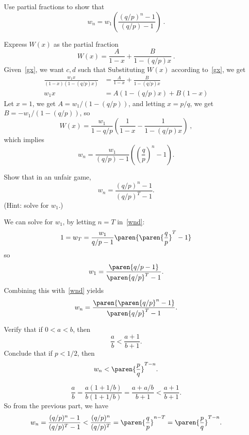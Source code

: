 \begin{problem}
\begin{solution}
\end{solution}

\ppart Use partial fractions to show that 
\begin{equation}\label{wnd}
w_n = w_1 \left( \frac{(q/p)^n - 1}{(q/p)-1}\right) \ .
\end{equation}

\begin{solution}

  Express $W(x)$ as the partial fraction 
  \[ W(x) = \frac{A}{1-x} + \frac{B}{1-(q/p)x} \ . \]
  Given~\eqref{gx}, we want $c,d$ such that
  Substituting $W(x)$ according to~\eqref{gx}, we get
\begin{align*}
    \frac{w_1 x}{(1-x)(1-(q/p)x)} &= \frac{A}{1-x} + \frac{B}{1-(q/p)x}
    \\
    w_1 x &= A(1-(q/p)x) + B(1-x)
\end{align*}
  Let $x=1$, we get $A = w_1/(1-(q/p))$, and letting $x=p/q$, we get
  $B = -w_1/(1-(q/p))$, so
  \[
W(x) = \frac{w_1}{1-q/p}\left(\frac{1}{1-x} -
    \frac{1}{1-(q/p)x}\right) \ ,
\]
  which implies
 \[
w_n = \frac{w_1}{(q/p)-1}\left(\left(\frac{q}{p}\right)^n -
    1\right) .
\]

\end{solution}

\ppart  Show that in an unfair game,
\[
w_n=\frac{(q/p)^n-1}{(q/p)^T-1}.
\]
(Hint: solve for $w_1$.)

\begin{solution}

We can solve for $w_1$, by letting $n=T$ in~\eqref{wnd}:
\[
1=w_T = \frac{w_1}{q/p-1} \paren{\paren{\frac{q}{p}}^T -1}
\]
so
\[
w_1 = \frac{\paren{q/p -1}}{\paren{q/p}^T - 1}.
\]
Combining this with~\eqref{wnd} yields
\[
w_n = \frac{\paren{\paren{q/p}^n -1}}{\paren{q/p}^T -1}.
\]

\end{solution}

\ppart Verify that if $0 < a < b$, then
\[
\frac{a}{b} < \frac{a+1}{b+1}.
\]
Conclude that if $p < 1/2$, then
\[
w_n < \paren{\frac{p}{q}}^{T-n}.
\]

\begin{solution}
\[
\frac{a}{b} = \frac{a(1+1/b)}{b(1+1/b)} = \frac{a+a/b}{b+1} < \frac{a+1}{b+1}.
\]
So from the previous part, we have
\[
w_n=\frac{(q/p)^n-1}{(q/p)^T-1} < \frac{(q/p)^n}{(q/p)^T} =
\paren{\frac{q}{p}}^{n-T} = \paren{\frac{p}{q}}^{T-n}.
\]

\end{solution}

\eparts
\end{problem}
